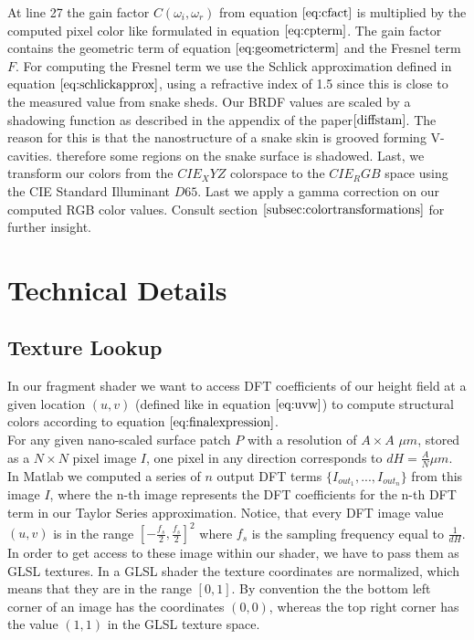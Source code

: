 At line 27 the gain factor $C(\omega_i, \omega_r)$ from equation $\ref{eq:cfact}$ is multiplied by the computed pixel color like formulated in equation $\ref{eq:cpterm}$. The gain factor contains the geometric term of equation $\ref{eq:geometricterm}$ and the Fresnel term $F$. For computing the Fresnel term we use the Schlick approximation defined in equation $\ref{eq:schlickapprox}$, using a refractive index of 1.5 since this is close to the measured value from snake sheds. Our BRDF values are scaled by a shadowing function as described in the appendix of the paper$\cite{diffstam}$. The reason for this is that the nanostructure of a snake skin is grooved forming V-cavities. therefore some regions on the snake surface is shadowed. Last, we transform our colors from the $CIE_XYZ$ colorspace to the $CIE_RGB$ space using the CIE Standard Illuminant $D65$. Last we apply a gamma correction on our computed RGB color values. Consult section $\ref{subsec:colortransformations}$ for further insight.

\section{Technical Details}
\subsection{Texture Lookup}
\label{sec:texturelookupcoords}
In our fragment shader we want to access DFT coefficients of our height field at a given location $(u,v)$ (defined like in equation $\ref{eq:uvw}$) to compute structural colors according to equation $\ref{eq:finalexpression}$. \\

For any given nano-scaled surface patch $P$ with a resolution of $A \times A$ $\mu m$, stored as a $N \times N$ pixel image $I$, one pixel in any direction corresponds to $dH = \frac{A}{N} \mu m$. In Matlab we computed a series of $n$ output DFT terms $\{I_{out_1},...,I_{out_n}\}$ from this image $I$, where the n-th image represents the DFT coefficients for the n-th DFT term in our Taylor Series approximation. Notice, that every DFT image value $(u,v)$ is in the range $[-\frac{f_s}{2}, \frac{f_s}{2}]^2$ where $f_s$ is the sampling frequency equal to $\frac{1}{dH}$. \\

In order to get access to these image within our shader, we have to pass them as GLSL textures. In a GLSL shader the texture coordinates are normalized, which means that they are in the range $[0,1]$. By convention the the bottom left corner of an image has the coordinates $(0,0)$, whereas the top right corner has the value $(1,1)$ in the GLSL texture space. \\ 

